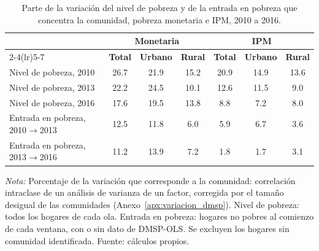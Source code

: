 \begin{table}[H]
  \centering
  \caption{Parte de la variación del nivel de pobreza y de la entrada en pobreza que
  concentra la comunidad, pobreza monetaria e IPM, 2010 a 2016.}
  \label{tab:robustez_icc}
  \footnotesize
  \setlength{\tabcolsep}{5pt}
  \begin{tabular}{l ccc ccc}
    \toprule
    & \multicolumn{3}{c}{\textbf{Monetaria}} & \multicolumn{3}{c}{\textbf{IPM}} \\
    \cmidrule(lr){2-4}\cmidrule(lr){5-7}
    & \textbf{Total} & \textbf{Urbano} & \textbf{Rural} & \textbf{Total} & \textbf{Urbano} & \textbf{Rural} \\
    \midrule
    Nivel de pobreza, 2010 & 26.7 & 21.9 & 15.2 & 20.9 & 14.9 & 13.6 \\
    Nivel de pobreza, 2013 & 22.2 & 24.5 & 10.1 & 12.6 & 11.5 & 9.0 \\
    Nivel de pobreza, 2016 & 17.6 & 19.5 & 13.8 & 8.8 & 7.2 & 8.0 \\
    Entrada en pobreza, 2010$\to$2013 & 12.5 & 11.8 & 6.0 & 5.9 & 6.7 & 3.6 \\
    Entrada en pobreza, 2013$\to$2016 & 11.2 & 13.9 & 7.2 & 1.8 & 1.7 & 3.1 \\
    \bottomrule
  \end{tabular}
  \begin{minipage}{0.95\textwidth}
    \vspace{4pt}
    \footnotesize \textit{Nota:} Porcentaje de la variación que corresponde a la
    comunidad: correlación intraclase de un análisis de varianza de un factor, corregida
    por el tamaño desigual de las comunidades (Anexo~\ref{apx:variacion_dmsp}). Nivel de
    pobreza: todos los hogares de cada ola. Entrada en pobreza: hogares no pobres al
    comienzo de cada ventana, con o sin dato de DMSP-OLS. Se excluyen los hogares sin
    comunidad identificada.
    Fuente: cálculos propios.
  \end{minipage}
\end{table}
